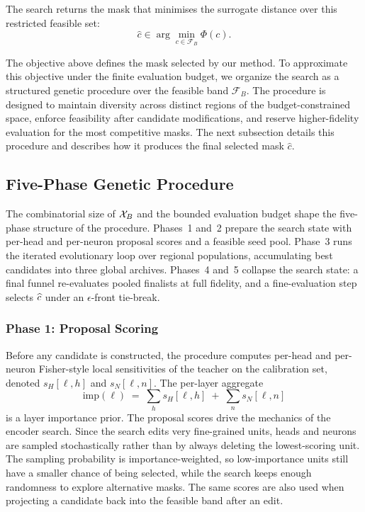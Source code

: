 The search returns the mask that minimises the surrogate distance over this restricted feasible set:
\[
\hat{c}
\in
\arg\min_{c \in \mathcal{F}_{B}}
\Phi(c).
\]

The objective above defines the mask selected by our method. To approximate this objective under the finite evaluation budget, we organize the search as a structured genetic procedure over the feasible band $\mathcal{F}_{B}$. The procedure is designed to maintain diversity across distinct regions of the budget-constrained space, enforce feasibility after candidate modifications, and reserve higher-fidelity evaluation for the most competitive masks. The next subsection details this procedure and describes how it produces the final selected mask $\hat{c}$.

\subsection{Five-Phase Genetic Procedure}
\label{ga:overview}

The combinatorial size of $\mathcal{X}_B$ and the bounded evaluation budget shape the five-phase structure of the procedure. Phases~1 and~2 prepare the search state with per-head and per-neuron proposal scores and a feasible seed pool. Phase~3 runs the iterated evolutionary loop over regional populations, accumulating best candidates into three global archives. Phases~4 and~5 collapse the search state: a final funnel re-evaluates pooled finalists at full fidelity, and a fine-evaluation step selects $\widehat{c}$ under an $\epsilon$-front tie-break.

\subsubsection{Phase 1: Proposal Scoring}
\label{ga:phase_proposals}

Before any candidate is constructed, the procedure computes per-head and per-neuron Fisher-style local sensitivities of the teacher on the calibration set, denoted $s_H[\ell,h]$ and $s_N[\ell,n]$. The per-layer aggregate
\[
\mathrm{imp}(\ell) \;=\; \sum_h s_H[\ell,h] \;+\; \sum_n s_N[\ell,n]
\]
is a layer importance prior. The proposal scores drive the mechanics of the encoder search. Since the search edits very fine-grained units, heads and neurons are sampled stochastically rather than by always deleting the lowest-scoring unit. The sampling probability is importance-weighted, so low-importance units still have a smaller chance of being selected, while the search keeps enough randomness to explore alternative masks. The same scores are also used when projecting a candidate back into the feasible band after an edit.

